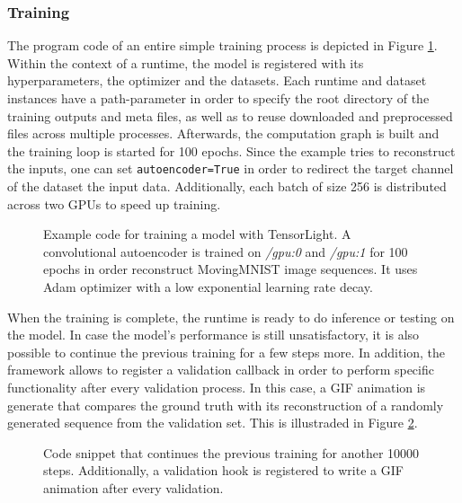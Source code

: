 \subsubsection*{Training}

The program code of an entire simple training process is depicted in Figure \ref{code:runtime_train}. Within the context of a runtime, the model is registered with its hyperparameters, the optimizer and the datasets. Each runtime and dataset instances have a path-parameter in order to specify the root directory of the training outputs and meta files, as well as to reuse downloaded and preprocessed files across multiple processes. Afterwards, the computation graph is built and the training loop is started for \num{100} epochs. Since the example tries to reconstruct the inputs, one can set \texttt{autoencoder=True} in order to redirect the target channel of the dataset the input data. Additionally, each batch of size \num{256} is distributed across two GPUs to speed up training.

\begin{figure}[htpb]
  
  \caption[Code: Training with TensorLight]{Example code for training a model with TensorLight. A convolutional autoencoder is trained on \textit{/gpu:0} and \textit{/gpu:1} for \num{100} epochs in order reconstruct MovingMNIST image sequences. It uses Adam optimizer with a low exponential learning rate decay.}
  \label{code:runtime_train}
\end{figure}

When the training is complete, the runtime is ready to do inference or testing on the model. In case the model's performance is still unsatisfactory, it is also possible to continue the previous training for a few steps more. In addition, the framework allows to register a validation callback in order to perform specific functionality after every validation process. In this case, a GIF animation is generate that compares the ground truth with its reconstruction of a randomly generated sequence from the validation set. This is illustraded in Figure \ref{code:runtime_hook}.

\begin{figure}[htpb]
  
  \caption[Code: Continuing Training and Validation Hooks in TensorLight]{Code snippet that continues the previous training for another \num{10000} steps. Additionally, a validation hook is registered to write a GIF animation after every validation.}
  \label{code:runtime_hook}
\end{figure}


